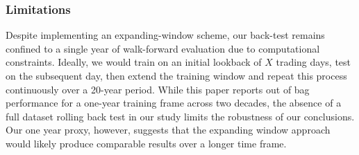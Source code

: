 \subsubsection{Limitations}


Despite implementing an expanding-window scheme, our back-test remains confined to a single year of walk-forward evaluation due to computational constraints. Ideally, we would train on an initial lookback of $X$ trading days, test on the subsequent day, then extend the training window and repeat this process continuously over a 20-year period. While this paper reports out of bag performance for a one-year training frame across two decades, the absence of a full dataset rolling back test in our study limits the robustness of our conclusions. Our one year proxy, however, suggests that the expanding window approach would likely produce comparable results over a longer time frame.


